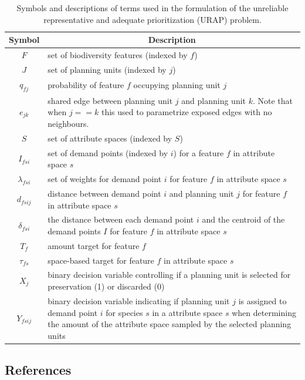 \documentclass[11pt,]{article}
\begin{document}
\begin{table}[H]
\caption{Symbols and descriptions of terms used in the formulation of the unreliable representative and adequate prioritization (URAP) problem.\label{term}} 
\begin{center}
\begin{tabular}{cl}
\toprule[1pt]
\multicolumn{1}{c}{Symbol}&\multicolumn{1}{c}{Description}\tabularnewline
\midrule
$F$&\parbox[t][][t]{15cm}{set of biodiversity features (indexed by $f$)}\tabularnewline
$J$&\parbox[t][][t]{15cm}{set of planning units (indexed by $j$)}\tabularnewline
$q_{fj}$&\parbox[t][][t]{15cm}{probability of feature $f$ occupying planning unit $j$}\tabularnewline
$e_{jk}$&\parbox[t][][t]{15cm}{shared edge between planning unit $j$ and planning unit $k$. Note that when $j==k$ this used to parametrize exposed edges with no neighbours.}\tabularnewline
$S$&\parbox[t][][t]{15cm}{set of attribute spaces (indexed by $S$)}\tabularnewline
$I_{fsi}$&\parbox[t][][t]{15cm}{set of demand points (indexed by $i$) for a feature $f$ in attribute space $s$}\tabularnewline
$\lambda_{fsi}$&\parbox[t][][t]{15cm}{set of weights for demand point $i$ for feature $f$ in attribute space $s$}\tabularnewline
$d_{fsij}$&\parbox[t][][t]{15cm}{distance between demand point $i$ and planning unit $j$ for feature $f$ in attribute space $s$}\tabularnewline
$\delta_{fsi}$&\parbox[t][][t]{15cm}{the distance between each demand point $i$ and the centroid of the demand points $I$ for feature $f$ in attribute space $s$}\tabularnewline
$T_f$&\parbox[t][][t]{15cm}{amount target for feature $f$}\tabularnewline
$\tau_{fs}$&\parbox[t][][t]{15cm}{space-based target for feature $f$ in attribute space $s$}\tabularnewline
$X_j$&\parbox[t][][t]{15cm}{binary decision variable controlling if a planning unit is selected for preservation (1) or discarded (0)}\tabularnewline
$Y_{fsij}$&\parbox[t][][t]{15cm}{binary decision variable indicating if planning unit $j$ is assigned to demand point $i$ for species $s$ in a attribute space $s$ when determining the amount of the attribute space sampled by the selected planning units}\tabularnewline
\bottomrule[1pt]
\end{tabular}\end{center}
\end{table}

\clearpage

\subsection*{References}\label{references}
\end{document}
